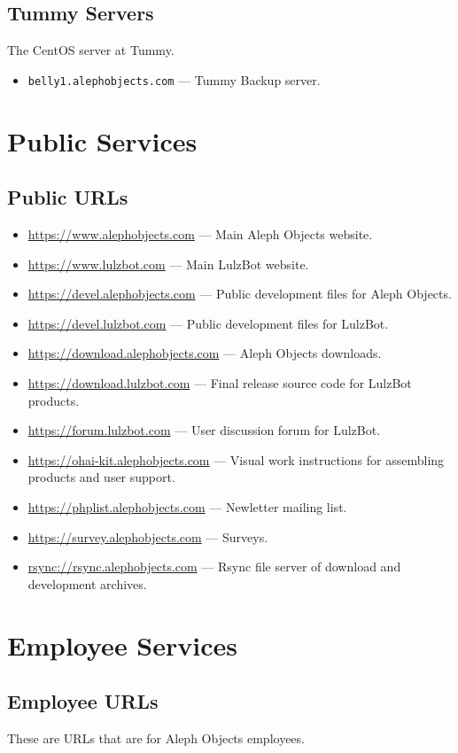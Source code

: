 \subsection{Tummy Servers}
The CentOS server at Tummy.

\begin{itemize}
\item \texttt{belly1.alephobjects.com} --- Tummy Backup server.
\end{itemize}

\section{Public Services}
\subsection{Public URLs}
\begin{itemize}
\item \url{https://www.alephobjects.com} --- Main Aleph Objects website.
\item \url{https://www.lulzbot.com} --- Main LulzBot website.
\item \url{https://devel.alephobjects.com} --- Public development files for
       Aleph Objects.
\item \url{https://devel.lulzbot.com} --- Public development files for LulzBot.
\item \url{https://download.alephobjects.com} --- Aleph Objects downloads.
\item \url{https://download.lulzbot.com} --- Final release source code for
       LulzBot products.
\item \url{https://forum.lulzbot.com} --- User discussion forum for LulzBot.
\item \url{https://ohai-kit.alephobjects.com} --- Visual work instructions for
       assembling products and user support.
\item \url{https://phplist.alephobjects.com} --- Newletter mailing list.
\item \url{https://survey.alephobjects.com} --- Surveys.
\item \url{rsync://rsync.alephobjects.com} --- Rsync file server of download
       and development archives.
\end{itemize}

\section{Employee Services}
\subsection{Employee URLs}
These are URLs that are for Aleph Objects employees.


